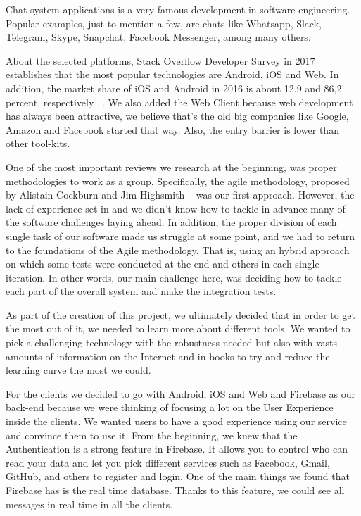 Chat system applications is a very famous development in software engineering. Popular examples, just to mention a few, are chats like Whatsapp, Slack, Telegram, Skype, Snapchat, Facebook Messenger, among many others.

About the selected platforms, Stack Overflow Developer Survey in 2017 ~\cite{DeveloperStackoverflow} establishes that the most popular technologies are Android, iOS and Web. In addition, the market share of iOS and Android in 2016 is about 12.9 and 86,2 percent, respectively ~\cite{DeveloperStackoverflow}.  We also added the Web Client because web development has always been attractive, we believe that's the old big companies like Google, Amazon and Facebook started that way. Also, the entry barrier is lower than other tool-kits.

One of the most important reviews we research at the beginning, was proper methodologies to work as a group. Specifically, the agile methodology, proposed by Alistain Cockburn and Jim Highsmith ~\cite{rury346} was our first approach. However, the lack of experience set in and we didn't know how to tackle in advance many of the software challenges laying ahead. In addition, the proper division of each single task of our software made us struggle at some point, and we had to return to the foundations of the Agile methodology. That is, using an hybrid approach on which some tests were conducted at the end and others in each single iteration. In other words, our main challenge here, was deciding how to tackle each part of the overall system and make the integration tests. 

As part of the creation of this project, we ultimately decided that in order to get the most out of it, we needed to learn more about different tools. We wanted to pick a challenging technology with the robustness needed but also with vasts amounts of information on the Internet and in books to try and reduce the learning curve the most we could. 

For the clients we decided to go with Android, iOS and Web and Firebase as our back-end because we were thinking of focusing a lot on the User Experience inside the clients. We wanted users to have a good experience using our service and convince them to use it. From the beginning, we knew that the Authentication is a strong feature in Firebase. It allows you to control who can read your data and let you pick different services such as Facebook, Gmail, GitHub, and others to register and login. One of the main things we found that Firebase has is the real time database. Thanks to this feature, we could see all messages in real time in all the clients. 

